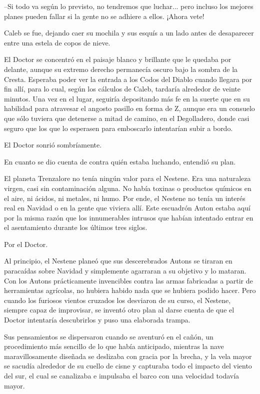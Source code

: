 --Si todo va según lo previsto, no tendremos que luchar... pero incluso los mejores planes pueden fallar si la gente no se adhiere a ellos. ¡Ahora vete!
 
Caleb se fue, dejando caer su mochila y sus esquís a un lado antes de desaparecer entre una estela de copos de nieve.
 
El Doctor se concentró en el paisaje blanco y brillante que le quedaba por delante, aunque su extremo derecho permanecía oscuro bajo la sombra de la Cresta. Esperaba poder ver la entrada a los Codos del Diablo cuando llegara por fin allí, para lo cual, según los cálculos de Caleb, tardaría alrededor de veinte minutos. Una vez en el lugar, seguiría depositando más fe en la suerte que en su habilidad para atravesar el angosto pasillo en forma de Z, aunque era un consuelo que sólo tuviera que detenerse a mitad de camino, en el Degolladero, donde casi seguro que los que lo esperasen para emboscarlo intentarían subir a bordo.
 
El Doctor sonrió sombríamente.
 
En cuanto se dio cuenta de contra quién estaba luchando, entendió su plan.
 
El planeta Trenzalore no tenía ningún valor para el Nestene. Era una naturaleza virgen, casi sin contaminación alguna. No había toxinas o productos químicos en el aire, ni ácidos, ni metales, ni humo. Por ende, el Nestene no tenía un interés real en Navidad o en la gente que viviera allí. Este escuadrón Auton estaba aquí por la misma razón que los innumerables intrusos que habían intentado entrar en el asentamiento durante los últimos tres siglos.
 
Por el Doctor.
 
Al principio, el Nestene planeó que sus descerebrados Autons se tiraran en paracaídas sobre Navidad y simplemente agarraran a su objetivo y lo mataran. Con los Autons prácticamente invencibles contra las armas fabricadas a partir de herramientas agrícolas, no hubiera habido nada que se hubiera podido hacer. Pero cuando los furiosos vientos cruzados los desviaron de su curso, el Nestene, siempre capaz de improvisar, se inventó otro plan al darse cuenta de que el Doctor intentaría descubrirlos y puso una elaborada trampa.
 
Sus pensamientos se dispersaron cuando se aventuró en el cañón, un procedimiento más sencillo de lo que había anticipado, mientras la nave maravillosamente diseñada se deslizaba con gracia por la brecha, y la vela mayor se sacudía alrededor de su cuello de cisne y capturaba todo el impacto del viento del sur, el cual se canalizaba e impulsaba el barco con una velocidad todavía mayor.
 
